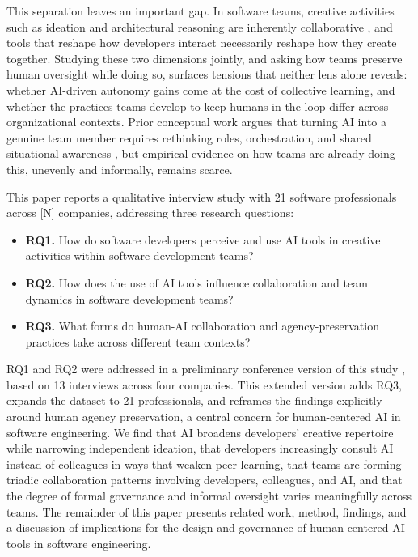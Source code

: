 \documentclass[10pt,journal,compsoc]{IEEEtran}
\begin{document}
This separation leaves an important gap. In software teams, creative activities such as ideation and architectural reasoning are inherently collaborative \cite{groeneveld2021}, and tools that reshape how developers interact necessarily reshape how they create together. Studying these two dimensions jointly, and asking how teams preserve human oversight while doing so, surfaces tensions that neither lens alone reveals: whether AI-driven autonomy gains come at the cost of collective learning, and whether the practices teams develop to keep humans in the loop differ across organizational contexts. Prior conceptual work argues that turning AI into a genuine team member requires rethinking roles, orchestration, and shared situational awareness \cite{seeber2020}, but empirical evidence on how teams are already doing this, unevenly and informally, remains scarce.

This paper reports a qualitative interview study with 21 software professionals across [N] companies, addressing three research questions:
\begin{itemize}
\item \textbf{RQ1.} How do software developers perceive and use AI tools in creative activities within software development teams?
\item \textbf{RQ2.} How does the use of AI tools influence collaboration and team dynamics in software development teams?
\item \textbf{RQ3.} What forms do human-AI collaboration and agency-preservation practices take across different team contexts?
\end{itemize}

RQ1 and RQ2 were addressed in a preliminary conference version of this study \cite{sbes2026}, based on 13 interviews across four companies. This extended version adds RQ3, expands the dataset to 21 professionals, and reframes the findings explicitly around human agency preservation, a central concern for human-centered AI in software engineering. We find that AI broadens developers' creative repertoire while narrowing independent ideation, that developers increasingly consult AI instead of colleagues in ways that weaken peer learning, that teams are forming triadic collaboration patterns involving developers, colleagues, and AI, and that the degree of formal governance and informal oversight varies meaningfully across teams. The remainder of this paper presents related work, method, findings, and a discussion of implications for the design and governance of human-centered AI tools in software engineering.
\end{document}
